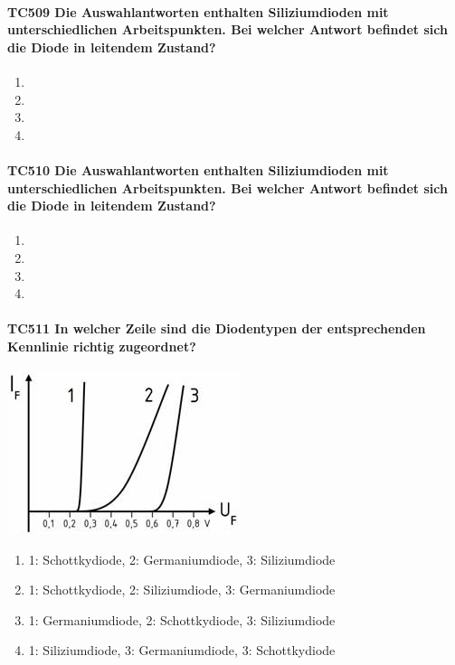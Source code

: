 \documentclass[8pt]{article}
\begin{document}
\begin{enumerate}
\begin{enumerate}[nolistsep,label=\Alph*]
{\paragraph*{TC509 Die Auswahlantworten enthalten Siliziumdioden mit unterschiedlichen Arbeitspunkten. Bei welcher Antwort befindet sich die Diode in leitendem Zustand?}
\begin{enumerate}[nolistsep,label=\Alph*]
\item 
\item 
\item 
\item 
\end{enumerate}

\paragraph*{TC510 Die Auswahlantworten enthalten Siliziumdioden mit unterschiedlichen Arbeitspunkten. Bei welcher Antwort befindet sich die Diode in leitendem Zustand?}
\begin{enumerate}[nolistsep,label=\Alph*]
\item 
\item 
\item 
\item 
\end{enumerate}

\paragraph*{TC511 In welcher Zeile sind die Diodentypen der entsprechenden Kennlinie richtig zugeordnet?}
\begin{center}
	\begin{minipage}{\linewidth}
		\centering
		\includegraphics[scale=1.0]{pics/tc511_a.jpg}
	\end{minipage}
\end{center}
\begin{enumerate}[nolistsep,label=\Alph*]
\item 1: Schottkydiode, 2: Germaniumdiode, 3: Siliziumdiode
\item 1: Schottkydiode, 2: Siliziumdiode, 3: Germaniumdiode
\item 1: Germaniumdiode, 2: Schottkydiode, 3: Siliziumdiode
\item 1: Siliziumdiode, 3: Germaniumdiode, 3: Schottkydiode
\end{enumerate}

}
\end{enumerate}
\end{enumerate}
\end{document}
